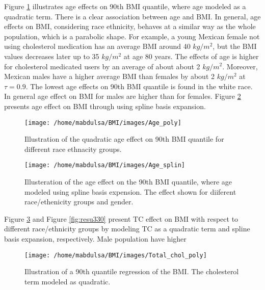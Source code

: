 \documentclass[
  12pt,
]{article}
\begin{document}
Figure \ref{fig:resu3} illustrates age effects on 90th BMI quantile, where age modeled as a quadratic term. There is a clear association between age and BMI. In general, age effects on BMI, considering race ethnicity, behaves at a similar way as the whole population, which is a parabolic shape. For example, a young Mexican female not using cholesterol medication has an average BMI around 40 \(kg/m^2\), but the BMI values decreases later up to 35 \(kg/m^2\) at age 80 years. The effects of age is higher for cholesterol medicated users by an average of about about 2 \(kg/m^2\). Moreover, Mexican males have a higher average BMI than females by about 2 \(kg/m^2\) at \(\tau =0.9\). The lowest age effects on 90th BMI quantile is found in the white race.
In general age effect on BMI for males are higher than for females. Figure \ref{fig:resu33} presents age effect on BMI through using spline basis expansion.

\begin{figure}

{\centering \texttt{[image: /home/mabdulsa/BMI/images/Age\_poly]} 

}

\caption{Illustration of the quadratic age effect on 90th BMI quantile for different race ethnacity groups.}\label{fig:resu3}
\end{figure}

\begin{figure}

{\centering \texttt{[image: /home/mabdulsa/BMI/images/Age\_splin]} 

}

\caption{Illusteration of the age effect on the 90th BMI quantile, where age modeled using spline basis expension. The effect shown for diiferent race/ethenicity groups and gender.}\label{fig:resu33}
\end{figure}

Figure \ref{fig:resu4} and Figure \ref{fig:resu330} present TC effect on BMI with respect to different race/ethnicity groups by modeling TC as a quadratic term and spline basis expansion, respectively. Male population have higher

\begin{figure}

{\centering \texttt{[image: /home/mabdulsa/BMI/images/Total\_chol\_poly]} 

}

\caption{Illustration of a 90th quantile regression of the BMI. The cholesterol term modeled as  quadratic.}\label{fig:resu4}
\end{figure}
\end{document}
